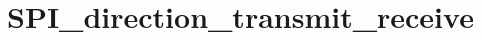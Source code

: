 \hypertarget{group___s_p_i__direction__transmit__receive}{\section{S\-P\-I\-\_\-direction\-\_\-transmit\-\_\-receive}
\label{group___s_p_i__direction__transmit__receive}
}
